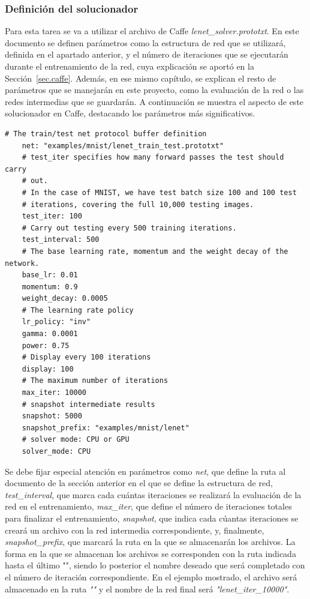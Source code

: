 \subsubsection{Definición del solucionador}
	Para esta tarea se va a utilizar el archivo de Caffe \textit{lenet\_solver.prototxt}. En este documento se definen parámetros como la estructura de red que se utilizará, definida en el apartado anterior, y el número de iteraciones que se ejecutarán durante el entrenamiento de la red, cuya explicación se aportó en la Sección~\ref{sec.caffe}. Además, en ese mismo capítulo, se explican el resto de parámetros que se manejarán en este proyecto, como la evaluación de la red o las redes intermedias que se guardarán. A continuación se muestra el aspecto de este solucionador en Caffe, destacando los parámetros más significativos.
	\vspace{20pt}
	\begin{lstlisting}[frame=single]
	# The train/test net protocol buffer definition
	net: "examples/mnist/lenet_train_test.prototxt"
	# test_iter specifies how many forward passes the test should carry 
	# out.
	# In the case of MNIST, we have test batch size 100 and 100 test
	# iterations, covering the full 10,000 testing images.
	test_iter: 100
	# Carry out testing every 500 training iterations.
	test_interval: 500
	# The base learning rate, momentum and the weight decay of the network.
	base_lr: 0.01
	momentum: 0.9
	weight_decay: 0.0005
	# The learning rate policy
	lr_policy: "inv"
	gamma: 0.0001
	power: 0.75
	# Display every 100 iterations
	display: 100
	# The maximum number of iterations
	max_iter: 10000
	# snapshot intermediate results
	snapshot: 5000
	snapshot_prefix: "examples/mnist/lenet"
	# solver mode: CPU or GPU
	solver_mode: CPU	
	\end{lstlisting}
	
	Se debe fijar especial atención en parámetros como \textit{net}, que define la ruta al documento de la sección anterior en el que se define la estructura de red, \textit{test\_interval}, que marca cada cuántas iteraciones se realizará la evaluación de la red en el entrenamiento, \textit{max\_iter}, que define el número de iteraciones totales para finalizar el entrenamiento, \textit{snapshot}, que indica cada cúantas iteraciones se creará un archivo con la red intermedia correspondiente, y, finalmente, \textit{snapshot\_prefix}, que marcará la ruta en la que se almacenarán los archivos. La forma en la que se almacenan los archivos se corresponden con la ruta indicada hasta el último "\text{/}", siendo lo posterior el nombre deseado que será completado con el número de iteración correspondiente. En el ejemplo mostrado, el archivo será almacenado en la ruta \textit{""}    y el nombre de la red final será \textit{"lenet\_iter\_10000"}.\\
	
